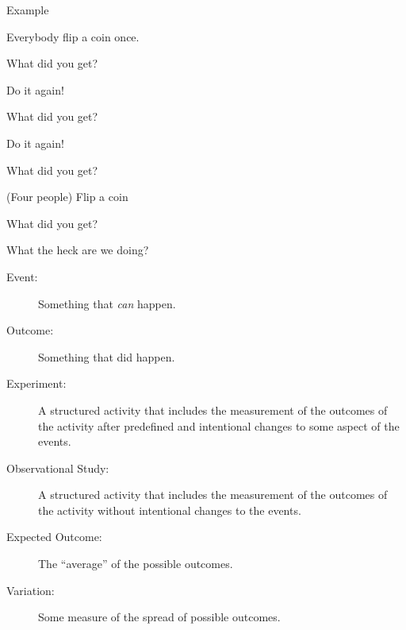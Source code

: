 \begin{frame}{Example}

  Everybody flip a coin once.

  {

    What did you get?

  }

  {

    Do it again!

  }

  {

    What did you get?

  }

  {

    Do it again!

  }

  {

    What did you get?

  }


  {

    (Four people) Flip a coin

  }

  {

    What did you get?

  }

  
\end{frame}

\begin{frame}{What the heck are we doing?}

  \begin{description}
  \item[Event:] Something that \textit{can} happen.
  \item[Outcome:] Something that did happen.
  \item[Experiment:] A structured activity that includes the
    measurement of the outcomes of the activity after predefined and
    intentional changes to some aspect of the events.
  \item[Observational Study:] A structured activity that includes the
    measurement of the outcomes of the activity without intentional
    changes to the events.
  \item[Expected Outcome:] The ``average'' of the possible outcomes.
  \item[Variation:] Some measure of the spread of possible outcomes.
  \end{description}
  
\end{frame}

